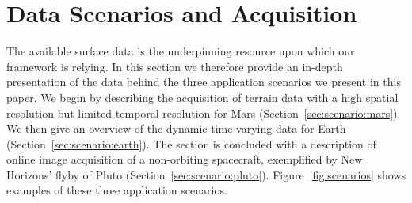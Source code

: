\documentclass[journal]{vgtc}                %
\newcommand{\fig}[1]{Figure~\ref{fig:#1}}
\begin{document}



\section{Data Scenarios and Acquisition} \label{sec:scenarios}
The available surface data is the underpinning resource upon which our framework is relying. In this section we therefore provide an in-depth presentation of the data behind the three application scenarios we present in this paper.
We begin by describing the acquisition of terrain data with a high spatial resolution but limited temporal resolution for Mars (Section~\ref{sec:scenario:mars}). We then give an overview of the dynamic time-varying data for Earth (Section~\ref{sec:scenario:earth}). The section is concluded with a description of online image acquisition of a non-orbiting spacecraft, exemplified by New Horizons' flyby of Pluto (Section~\ref{sec:scenario:pluto}).
\fig{scenarios} shows examples of these three application scenarios.

\end{document}
